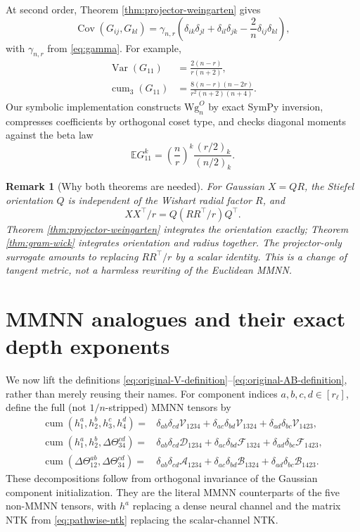 \documentclass{article}
\newtheorem{remark}[theorem]{Remark}
\newcommand{\E}{\mathbb E}
\newcommand{\Cov}{\operatorname{Cov}}
\newcommand{\Var}{\operatorname{Var}}
\newcommand{\cum}{\operatorname{cum}}
\begin{document}
At second order, Theorem \ref{thm:projector-weingarten} gives
\begin{equation}
\Cov(G_{ij},G_{kl})
=\gamma_{n,r}
\left(\delta_{ik}\delta_{jl}+\delta_{il}\delta_{jk}
-\frac2n\delta_{ij}\delta_{kl}\right),
\label{eq:projector-covariance}
\end{equation}
with \(\gamma_{n,r}\) from \eqref{eq:gamma}.  For example,
\begin{align}
\Var(G_{11})&=\frac{2(n-r)}{r(n+2)},\\
\cum_3(G_{11})&=\frac{8(n-r)(n-2r)}{r^2(n+2)(n+4)}.
\end{align}
Our symbolic implementation constructs \(\mathrm{Wg}^{O}_n\) by exact
SymPy inversion, compresses coefficients by orthogonal coset type, and checks
diagonal moments against the beta law
\begin{equation}
\E G_{11}^k=\left(\frac nr\right)^k
\frac{(r/2)_k}{(n/2)_k}.
\end{equation}

\begin{remark}[Why both theorems are needed]
For Gaussian \(X=QR\), the Stiefel orientation \(Q\) is independent of the
Wishart radial factor \(R\), and
\[
XX^\top/r=Q(RR^\top/r)Q^\top.
\]
Theorem \ref{thm:projector-weingarten} integrates the orientation exactly;
Theorem \ref{thm:gram-wick} integrates orientation and radius together.  The
projector-only surrogate amounts to replacing \(RR^\top/r\) by a scalar
identity.  This is a change of tangent metric, not a harmless rewriting of the
Euclidean MMNN.
\end{remark}

\section{MMNN analogues and their exact depth exponents}
\label{sec:mmnn-exponents}

We now lift the definitions
\eqref{eq:original-V-definition}--\eqref{eq:original-AB-definition}, rather
than merely reusing their names.  For component indices \(a,b,c,d\in[r_\ell]\),
define the full (not \(1/n\)-stripped) MMNN tensors by
\begin{align}
\cum(h^a_1,h^b_2,h^c_3,h^d_4)
={}&\delta_{ab}\delta_{cd}\mathcal V_{1234}
+\delta_{ac}\delta_{bd}\mathcal V_{1324}
+\delta_{ad}\delta_{bc}\mathcal V_{1423},
\label{eq:mmnn-V-definition}\\
\cum(h^a_1,h^b_2,\Delta\Theta^{cd}_{34})
={}&\delta_{ab}\delta_{cd}\mathcal D_{1234}
+\delta_{ac}\delta_{bd}\mathcal F_{1324}
+\delta_{ad}\delta_{bc}\mathcal F_{1423},
\label{eq:mmnn-DF-definition}\\
\cum(\Delta\Theta^{ab}_{12},\Delta\Theta^{cd}_{34})
={}&\delta_{ab}\delta_{cd}\mathcal A_{1234}
+\delta_{ac}\delta_{bd}\mathcal B_{1324}
+\delta_{ad}\delta_{bc}\mathcal B_{1423}.
\label{eq:mmnn-AB-definition}
\end{align}
These decompositions follow from orthogonal invariance of the Gaussian
component initialization.  They are the literal MMNN counterparts of the
five non-MMNN tensors, with \(h^a\) replacing a dense neural channel and the
matrix NTK from \eqref{eq:pathwise-ntk} replacing the scalar-channel NTK.
\end{document}
